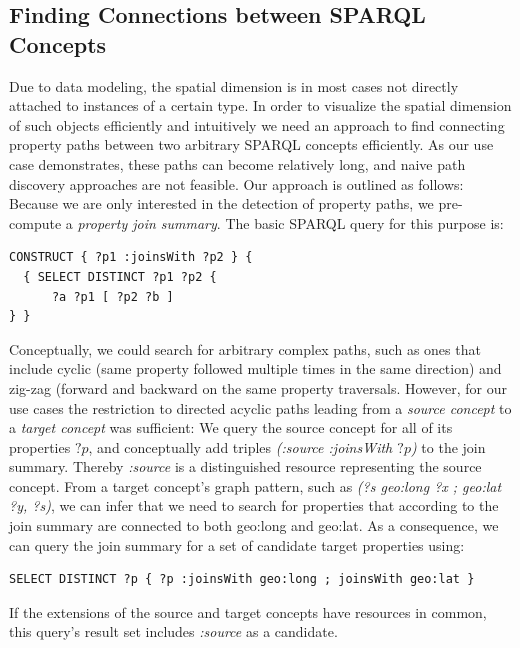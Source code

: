 \subsection{Finding Connections between SPARQL Concepts}
Due to data modeling, the spatial dimension is in most cases not directly attached to instances of a certain type.
In order to visualize the spatial dimension of such objects efficiently and intuitively we need an approach to find connecting property paths between two arbitrary SPARQL concepts efficiently.
As our use case demonstrates, these paths can become relatively
long, and naive path discovery approaches are not feasible.
Our approach is outlined as follows:
Because we are only interested in the detection of property paths, we
pre-compute a \emph{property join summary}. The basic SPARQL query for this
purpose is:
\begin{lstlisting}
CONSTRUCT { ?p1 :joinsWith ?p2 } {
  { SELECT DISTINCT ?p1 ?p2 {   
      ?a ?p1 [ ?p2 ?b ]
} }
\end{lstlisting}

Conceptually, we could search for arbitrary complex paths, such as ones that
include cyclic (same property followed multiple times in the same direction)
and zig-zag (forward and backward on the same
property
traversals. However, for our use cases the restriction to directed
acyclic paths leading from a \emph{source concept} to a \emph{target concept}
was sufficient: We query the source concept for all of its properties $?p$, and
conceptually add triples \emph{(:source :joinsWith $?p$)} to the join summary.
Thereby \emph{:source} is a distinguished resource representing the source
concept. From a target concept's graph pattern, such as \emph{(?s geo:long ?x ;
geo:lat ?y, ?s)}, we can infer that we need to search for properties that
according to the join summary are connected to both geo:long and geo:lat.
As a consequence, we can query the join summary for a set of candidate target
properties using:
\begin{lstlisting}
SELECT DISTINCT ?p { ?p :joinsWith geo:long ; joinsWith geo:lat }
\end{lstlisting} 
If the extensions of the source and target concepts have resources in
common, this query's result set includes \emph{:source} as a candidate.

